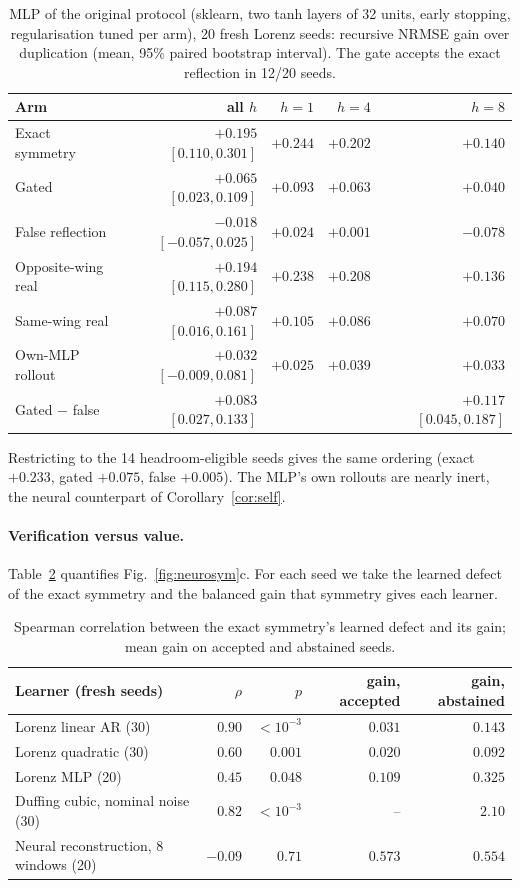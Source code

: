 \begin{table}[h]
\centering\small
\caption{MLP of the original protocol (sklearn, two tanh layers of 32 units, early stopping, regularisation tuned per arm), 20 fresh Lorenz seeds: recursive NRMSE gain over duplication (mean, 95\% paired bootstrap interval). The gate accepts the exact reflection in 12/20 seeds.}
\label{tab:mlp-recursive}
\begin{tabular}{lrrrr}
\toprule
Arm & all $h$ & $h=1$ & $h=4$ & $h=8$\\
\midrule
Exact symmetry & $+0.195$ $[0.110,0.301]$ & $+0.244$ & $+0.202$ & $+0.140$\\
Gated & $+0.065$ $[0.023,0.109]$ & $+0.093$ & $+0.063$ & $+0.040$\\
False reflection & $-0.018$ $[-0.057,0.025]$ & $+0.024$ & $+0.001$ & $-0.078$\\
Opposite-wing real & $+0.194$ $[0.115,0.280]$ & $+0.238$ & $+0.208$ & $+0.136$\\
Same-wing real & $+0.087$ $[0.016,0.161]$ & $+0.105$ & $+0.086$ & $+0.070$\\
Own-MLP rollout & $+0.032$ $[-0.009,0.081]$ & $+0.025$ & $+0.039$ & $+0.033$\\
\midrule
Gated $-$ false & $+0.083$ $[0.027,0.133]$ & & & $+0.117$ $[0.045,0.187]$\\
\bottomrule
\end{tabular}
\end{table}
Restricting to the 14 headroom-eligible seeds gives the same ordering (exact $+0.233$, gated $+0.075$, false $+0.005$). The MLP's own rollouts are nearly inert, the neural counterpart of Corollary~\ref{cor:self}.

\paragraph{Verification versus value.} Table~\ref{tab:antic} quantifies Fig.~\ref{fig:neurosym}c. For each seed we take the learned defect of the exact symmetry and the balanced gain that symmetry gives each learner.
\begin{table}[h]
\centering\small
\caption{Spearman correlation between the exact symmetry's learned defect and its gain; mean gain on accepted and abstained seeds.}
\label{tab:antic}
\begin{tabular}{lrrrr}
\toprule
Learner (fresh seeds) & $\rho$ & $p$ & gain, accepted & gain, abstained\\
\midrule
Lorenz linear AR (30) & $0.90$ & $<10^{-3}$ & $0.031$ & $0.143$\\
Lorenz quadratic (30) & $0.60$ & $0.001$ & $0.020$ & $0.092$\\
Lorenz MLP (20) & $0.45$ & $0.048$ & $0.109$ & $0.325$\\
Duffing cubic, nominal noise (30) & $0.82$ & $<10^{-3}$ & -- & $2.10$\\
Neural reconstruction, 8 windows (20) & $-0.09$ & $0.71$ & $0.573$ & $0.554$\\
\bottomrule
\end{tabular}
\end{table}

